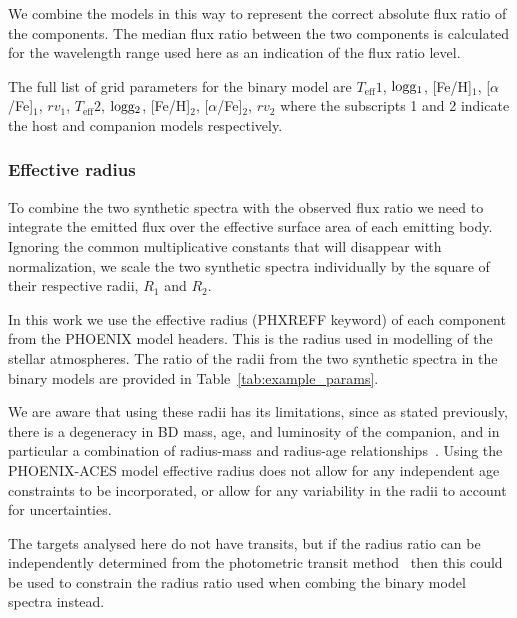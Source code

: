 \documentclass[fleqn,usenatbib]{mnras}
\newcommand*\bl{\color{blue}}
\begin{document}
    We combine the models in this way to represent the correct absolute flux ratio of the components. The median flux ratio between the two components is calculated for the wavelength range used here as an indication of the flux ratio level.
    
    {\bl The full list of grid parameters for the binary model are \(T_{\textrm{eff}}1\),  \(\rm logg_1\), [Fe/H]$_1$, [\(\alpha\)/Fe]$_1$, ${rv}_1$, \(T_{\textrm{eff}}2\), \(\rm logg_2\), [Fe/H]$_2$, [\(\alpha\)/Fe]$_2$, ${rv}_2$ where the subscripts 1 and 2 indicate the host and companion models respectively.}
    
    \subsubsection{Effective radius}
    \label{subsection-radius}
    To combine the two synthetic spectra with the observed flux ratio we need to integrate the emitted flux over the effective surface area of each emitting body. Ignoring the common multiplicative constants that will disappear with normalization, we scale the two synthetic spectra individually by the square of their respective radii, \(R_1\) and \(R_2\).
    
    In this work we use the effective radius (PHXREFF keyword) of each component from the PHOENIX model headers. This is the radius used in modelling of the stellar atmospheres. The ratio of the radii from the two synthetic spectra in the binary models are provided in Table~\ref{tab:example_params}.
    
    We are aware that using these radii has its limitations, since as stated previously, there is a degeneracy in BD mass, age, and luminosity of the companion, and in particular a combination of radius-mass and radius-age relationships~\citep{sorahana_radii_2013}. Using the PHOENIX-ACES model effective radius does not allow for any independent age constraints to be incorporated, or allow for any variability in the radii to account for uncertainties.
    
    The targets analysed here do not have transits, but if the radius ratio can be independently determined from the photometric transit method~\citep{deeg_photometric_1998} then this could be used to constrain the radius ratio used when combing the binary model spectra instead.
    
\end{document}
